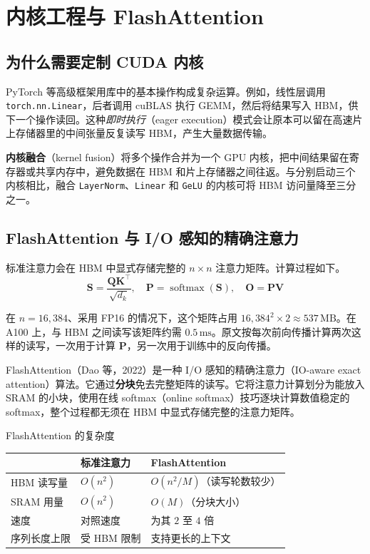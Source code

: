 \chapter{内核工程与 FlashAttention}

\section{为什么需要定制 CUDA 内核}

PyTorch 等高级框架用库中的基本操作构成复杂运算。例如，线性层调用 \texttt{torch.nn.Linear}，后者调用 cuBLAS 执行 GEMM，然后将结果写入 HBM，供下一个操作读回。这种\emph{即时执行}（eager execution）模式会让原本可以留在高速片上存储器里的中间张量反复读写 HBM，产生大量数据传输。

\textbf{内核融合}（kernel fusion）将多个操作合并为一个 GPU 内核，把中间结果留在寄存器或共享内存中，避免数据在 HBM 和片上存储器之间往返。与分别启动三个内核相比，融合 \texttt{LayerNorm}、\texttt{Linear} 和 \texttt{GeLU} 的内核可将 HBM 访问量降至三分之一。

\section{FlashAttention 与 I/O 感知的精确注意力}

标准注意力会在 HBM 中显式存储完整的 \(n\times n\) 注意力矩阵。计算过程如下。
\[
  \mathbf{S}=\frac{\mathbf{Q}\mathbf{K}^{\top}}{\sqrt{d_k}},\quad
  \mathbf{P}=\operatorname{softmax}(\mathbf{S}),\quad
  \mathbf{O}=\mathbf{P}\mathbf{V}
\]

在 \(n=16{,}384\)、采用 FP16 的情况下，这个矩阵占用 \(16{,}384^2\times 2\approx 537\,\mathrm{MB}\)。在 A100 上，与 HBM 之间读写该矩阵约需 \(0.5\,\mathrm{ms}\)。原文按每次前向传播计算两次这样的读写，一次用于计算 \(\mathbf{P}\)，另一次用于训练中的反向传播。

FlashAttention（Dao 等，2022）是一种 I/O 感知的精确注意力（IO-aware exact attention）算法。它通过\textbf{分块}免去完整矩阵的读写。它将注意力计算划分为能放入 SRAM 的小块，使用在线 softmax（online softmax）技巧逐块计算数值稳定的 softmax，整个过程都无须在 HBM 中显式存储完整的注意力矩阵。

\begin{conceptbox}{FlashAttention 的复杂度}
\begin{tabularx}{\linewidth}{@{}p{.26\linewidth}p{.24\linewidth}X@{}}
  & \textbf{标准注意力} & \textbf{FlashAttention} \\
  \midrule
  HBM 读写量 & \(O(n^2)\) & \(O(n^2/M)\)（读写轮数较少） \\
  SRAM 用量 & \(O(n^2)\) & \(O(M)\)（分块大小） \\
  速度 & 对照速度 & 为其 \(2\) 至 \(4\) 倍 \\
  序列长度上限 & 受 HBM 限制 & 支持更长的上下文 \\
\end{tabularx}
\end{conceptbox}

